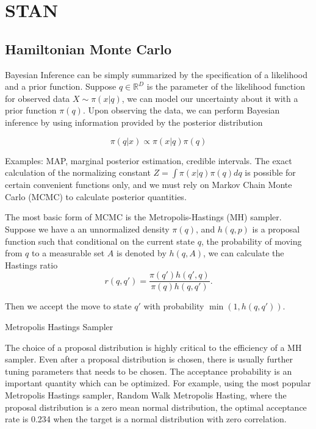 \documentclass[]{report}
\begin{document}
\chapter{STAN}
\section{Hamiltonian Monte Carlo}

Bayesian Inference can be simply summarized by the specification of a likelihood and a prior function. Suppose $q \in \mathbb{R}^D$ is the parameter of the likelihood function for observed data $X \sim \pi(x|q)$, we can
model our uncertainty about it with a prior function $\pi(q)$. Upon observing the data, we can perform Bayesian inference by using information provided by the posterior distribution 

\[ \pi(q | x ) \propto \pi(x | q) \pi(q) \]

Examples: MAP, marginal posterior estimation, credible intervals. The exact calculation of the normalizing constant $Z = \int \pi(x | q) \pi(q) dq $ is possible for certain convenient functions only, and we must rely on Markov Chain Monte Carlo (MCMC) to calculate posterior quantities. 


The most basic form of MCMC is the Metropolis-Hastings (MH) sampler. Suppose we have a an unnormalized density $\pi(q)$, and $h(q,p)$ is a proposal function such that conditional on the current state $q$, the probability of moving from $q$ to a measurable set $A$ is denoted by $h(q,A)$, we can calculate the Hastings ratio
\[ r(q,q') = \frac{\pi(q')h(q',q)}{\pi(q)h(q,q')}. \]

Then we accept the move to state $q'$ with probability $ \min (1, h(q,q')) $.

\begin{algorithm}
\caption{Metropolis Hastings Sampler}


 
 
\end{algorithm}


The choice of a proposal distribution is highly critical to the efficiency of a MH sampler. Even after a proposal distribution is chosen, there is usually further tuning parameters that needs to be chosen. The acceptance probability is an important quantity which 
can be optimized. For example, using the most popular Metropolis Hastings sampler, Random Walk Metropolis Hasting, where the proposal distribution is a zero mean normal distribution,
the optimal acceptance rate is 0.234 when the target is a normal distribution with zero correlation.\cite{roberts1997weak,gelman1996efficient,roberts2001optimal} 
\end{document}
